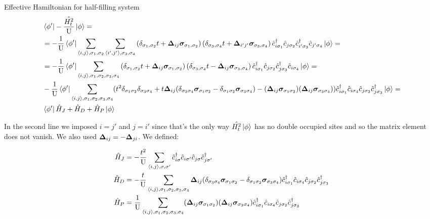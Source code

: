 \begin{section}{Effective Hamiltonian for half-filling system}
\begin{align}
\label{PertNoEMF}
&\bra{\phi'} -\frac{\hat{H_t^2}}{\text{U}} \ket{\phi} = \nonumber \\
&= -\frac{1}{\text{U}} \bra{\phi'}\sum_{\langle i,j \rangle, \sigma_1, \sigma_2} \sum_{\langle i',j' \rangle, 					\sigma_3, \sigma_4} \left( \delta_{\sigma_1, \sigma_2} t + \boldsymbol{\Delta}_{ij} \boldsymbol{\sigma}_{\sigma_1, \sigma_2} \right) \left( \delta_{\sigma_3, \sigma_4} t + \boldsymbol{\Delta}_{i'j'} \boldsymbol{\sigma}_{\sigma_3, \sigma_4} \right)\hat{c}_{i\sigma_1}^\dagger \hat{c}_{j \sigma_2} \hat{c}_{i' \sigma_3}^\dagger \hat{c}_{j'\sigma_4} \ket{\phi} = \nonumber \\
&= -\frac{1}{\text{U}} \bra{\phi'}\sum_{\langle i,j \rangle, \sigma_1, \sigma_2, \sigma_3, \sigma_4} \left( \delta_{\sigma_1, \sigma_2} t + \boldsymbol{\Delta}_{ij} \boldsymbol{\sigma}_{\sigma_1, \sigma_2} \right) \left( \delta_{\sigma_3, \sigma_4} t - \boldsymbol{\Delta}_{ij} \boldsymbol{\sigma}_{\sigma_3, \sigma_4} \right)\hat{c}_{i\sigma_1}^\dagger \hat{c}_{j \sigma_2} \hat{c}_{j \sigma_3}^\dagger \hat{c}_{i\sigma_4} \ket{\phi} = \nonumber \\
&-\frac{1}{\text{U}} \bra{\phi'} \sum_{\langle i,j \rangle, \sigma_1, \sigma_2, \sigma_3, \sigma_4} (t^2 						\delta_{\sigma_1 \sigma_2}\delta_{\sigma_3 \sigma_4} + t\boldsymbol{\Delta}_{ij}(\delta_{\sigma_3 \sigma_4}			\boldsymbol{\sigma}_{\sigma_1 \sigma_2} - \delta_{\sigma_1 \sigma_2} \boldsymbol{\sigma}_{\sigma_3 \sigma_4}) - (\boldsymbol{\Delta}_{ij}\boldsymbol{\sigma}_{\sigma_1 \sigma_2})(\boldsymbol{\Delta}_{ij} \boldsymbol{\sigma}_{\sigma_3 \sigma_4}) ) \hat{c}_{i\sigma_1}^\dagger \hat{c}_{i\sigma_4} \hat{c}_{j 		\sigma_2} \hat{c}_{j \sigma_3}^\dagger \ket{\phi} = \nonumber \\
& \bra{\phi'} \hat{H}_J + \hat{H}_D + \hat{H}_P \ket{\phi}
\end{align}

In the second line we imposed $i=j'$ and $j=i'$ since that's the only way $\hat{H_t^2}\ket{\phi}$ has no double occupied sites and so the matrix element does not vanish. We also used $\boldsymbol{\Delta}_{ij} = - \boldsymbol{\Delta}_{ji}$. We defined:

\begin{align}
\hat{H}_J &= -\frac{t^2}{\text{U}} \sum_{\langle i,j \rangle, \sigma, \sigma'} \hat{c}_{i\sigma}^\dagger \hat{c}_{i\sigma'} \hat{c}_{j\sigma} \hat{c}_{j \sigma'}^\dagger \\
\hat{H}_D &= -\frac{t}{\text{U}}\sum_{\langle i,j \rangle, \sigma_1, \sigma_2, \sigma_3, \sigma_4} \boldsymbol{\Delta}_{ij}(\delta_{\sigma_3 \sigma_4}	\boldsymbol{\sigma}_{\sigma_1 \sigma_2} - \delta_{\sigma_1 \sigma_2} \boldsymbol{\sigma}_{\sigma_3 	\sigma_4}) \hat{c}_{i\sigma_1}^\dagger \hat{c}_{i\sigma_4} \hat{c}_{j \sigma_2} \hat{c}_{j \sigma_3}^\dagger \\
\hat{H}_P &= \frac{1}{\text{U}}\sum_{\langle i,j \rangle, \sigma_1, \sigma_2, \sigma_3, \sigma_4} (\boldsymbol{\Delta}_{ij}\boldsymbol{\sigma}_{\sigma_1 \sigma_2})(\boldsymbol{\Delta}_{ij} \boldsymbol{\sigma}_{\sigma_3 \sigma_4}) \hat{c}_{i\sigma_1}^\dagger \hat{c}_{i\sigma_4} \hat{c}_{j \sigma_2} \hat{c}_{j \sigma_3}^\dagger
\end{align}


\end{section}

